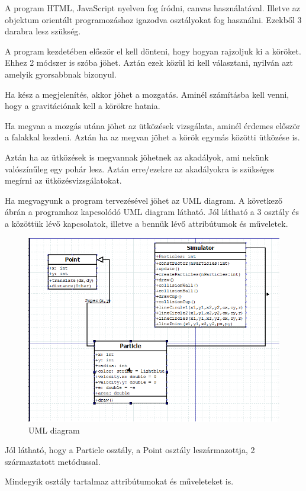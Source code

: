 A program HTML, JavaScript nyelven fog íródni, canvas használatával. Illetve az objektum orientált programozáshoz igazodva osztályokat fog használni. Ezekből 3 darabra lesz szükség. 




A program kezdetében először el kell dönteni, hogy hogyan rajzoljuk ki a köröket. Ehhez 2 módszer is szóba jöhet. Aztán ezek közül ki kell választani, nyilván azt amelyik gyorsabbnak bizonyul. 


Ha kész a megjelenítés, akkor jöhet a mozgatás. Aminél számításba kell venni, hogy a gravitációnak kell a körökre hatnia. 


Ha megvan a mozgás utána jöhet az ütközések vizsgálata, aminél érdemes először a falakkal kezdeni. Aztán ha az megvan jöhet a körök egymás közötti ütközése is. 


Aztán ha az ütközések is megvannak jöhetnek az akadályok, ami nekünk valószínűleg egy pohár lesz. Aztán erre/ezekre az akadályokra is szükséges megírni az ütközésvizsgálatokat. 


Ha megvagyunk a program tervezésével jöhet az UML diagram. A következő ábrán  a programhoz kapcsolódó UML diagram látható. Jól látható a 3 osztály és a közöttük lévő kapcsolatok, illetve a bennük lévő attribútumok és műveletek. 


\begin{figure}[h]
	\centering
	\includegraphics[scale=1]{images/dia.png}
	\caption{UML diagram}
	\label{fig:dia}
\end{figure}


Jól látható, hogy a Particle osztály, a Point osztály leszármazottja, 2 származtatott metódussal.

Mindegyik osztály tartalmaz attribútumokat és műveleteket is. 

